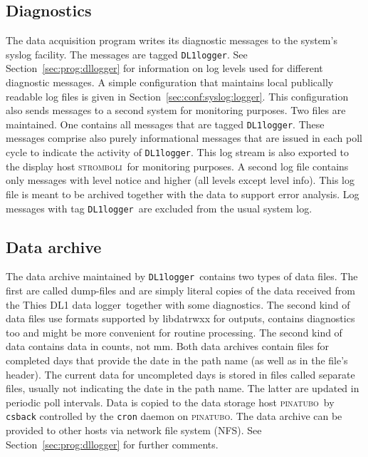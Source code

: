 \documentclass[twoside]{article}
\newcommand{\DTDL}{Thies DL1 data logger}
\newcommand{\DLlogger}{\texttt{DL1logger}}
\newcommand{\Dstoragehost}{\textsc{pinatubo}}
\newcommand{\Ddisplayhost}{\textsc{stromboli}}
\begin{document}
\begin{multicols}{2}
\subsection{Diagnostics}
The data acquisition program writes its diagnostic messages to the system's
syslog facility. 
The messages are tagged \DLlogger.
See Section~\ref{sec:prog:dllogger} for information on log levels used for
different diagnostic messages.
A simple configuration that maintains local publically readable log files
is given in Section~\ref{sec:conf:syslog:logger}.
This configuration also sends messages to a second system for monitoring
purposes.
Two files are maintained. 
One contains all messages that are tagged \DLlogger.
These messages comprise also purely informational messages that are issued in
each poll cycle to indicate the activity of \DLlogger. 
This log stream is also exported to the display host \Ddisplayhost\ for
monitoring purposes.
A second log file contains only messages with level notice and higher (all
levels except level info). 
This log file is meant to be archived together with the data to support error
analysis.
Log messages with tag \DLlogger\ are excluded from the usual system log.

\subsection{Data archive}
The data archive maintained by \DLlogger\ contains two types of data files.
The first are called dump-files and are simply literal copies of the data
received from the \DTDL\ together with some diagnostics.
The second kind of data files use formats supported by libdatrwxx for outputs,
contains diagnostics too and might be more convenient for routine processing.
The second kind of data contains data in counts, not mm.
Both data archives contain files for completed days that provide the date in
the path name (as well as in the file's header).
The current data for uncompleted days is stored in files called
separate files, usually not indicating the date in the path name.
The latter are updated in periodic poll intervals.
Data is copied to the data storage host \Dstoragehost\ by \texttt{csback}
controlled by the \texttt{cron} daemon on \Dstoragehost.
The data archive can be provided to other hosts via network file system (NFS).
See Section~\ref{sec:prog:dllogger} for further comments.


\end{multicols}
\end{document}
